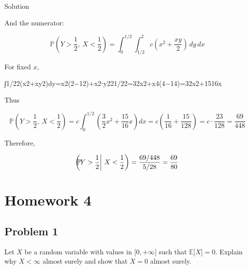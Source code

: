 \documentclass{qlnotes-export}
\begin{document}
\begin{qlsolution}{Solution}
\begin{itemize}
  And the numerator:

  \[{\mathbb{P}}\left( {Y > \frac{1}{2},\ X < \frac{1}{2}} \right) = \int_{0}^{1/2}\int_{1/2}^{2}c\left( {x^{2} + \frac{xy}{2}} \right)\, dy\, dx\]

  For fixed \(x\),

  {∫1/22(x2+xy2)dy=x2(2−12)+x2⋅y221/22=32x2+x4(4−14)=32x2+1516x}

  Thus

  \[{\mathbb{P}}\left( {Y > \frac{1}{2},\ X < \frac{1}{2}} \right) = c\int_{0}^{1/2}\left( {\frac{3}{2}x^{2} + \frac{15}{16}x} \right)dx = c\left( {\frac{1}{16} + \frac{15}{128}} \right) = c \cdot \frac{23}{128} = \frac{69}{448}\]

  Therefore,

  \[{\mathbb{P}}\mspace{-18mu}\left( Y > \frac{1}{2} \middle| \ X < \frac{1}{2} \right) = \frac{69/448}{5/28} = \frac{69}{80}\]
\end{itemize}

\end{qlsolution}

\chapter{Homework 4}\label{homework-4}

\section{Problem 1}\label{problem-1-4}

Let \(X\) be a random variable with values in \(\lbrack 0, + \infty\rbrack\) such that \({\mathbb{E}}\lbrack X\rbrack = 0\). Explain why \(X < \infty\) almost surely and show that \(X = 0\) almost surely.
\end{document}
